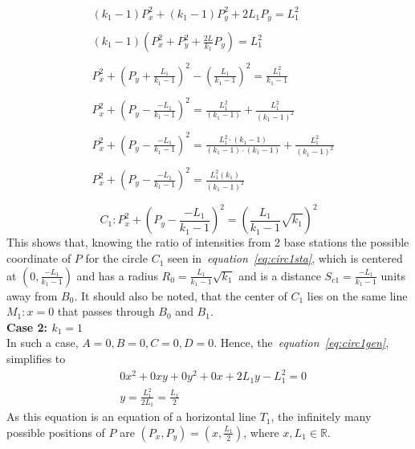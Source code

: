 \documentclass[a4paper,12pt]{article}
\begin{document}
\begin{equation*}
    \begin{split}
        &(k_1-1)P_x^2 + (k_1-1)P_y^2 +2L_1P_y = L_1^2\\\\
        &(k_1-1)\left(P_x^2 + P_y^2 + \frac{2L}{k_1}P_y\right)=L_1^2\\\\
        &P_x^2 + \left(P_y+ \frac{L_1}{k_1-1} \right)^2 - \left(\frac{L_1}{k_1-1}\right)^2 = \frac{L_1^2}{k_1-1}\\\\
        &P_x^2 + \left(P_y - \frac{-L_1}{k_1-1} \right)^2 = \frac{L_1^2}{(k_1-1)} + \frac{L_1^2}{(k_1-1)^2}\\\\
        &P_x^2 + \left(P_y - \frac{-L_1}{k_1-1} \right)^2 = \frac{L_1^2\cdot (k_1-1)}{(k_1-1)\cdot (k_1-1)} + \frac{L_1^2}{(k_1-1)^2}\\\\
        &P_x^2 + \left(P_y - \frac{-L_1}{k_1-1} \right)^2 = \frac{L_1^2(k_1)}{(k_1-1)^2}\\\\
    \end{split}
\end{equation*}
\begin{equation}
    C_1: P_x^2 + \left(P_y - \frac{-L_1}{k_1-1} \right)^2 = \left(\frac{L_1}{k_1-1}\sqrt{k_1}\right)^2
\label{eq:circ1sta}
\end{equation}
This shows that, knowing the ratio of intensities from 2 base stations the possible coordinate of $P$ for the circle $C_1$ seen in~\textit{equation~\ref{eq:circ1sta}}, 
which is centered at $(0,\frac{-L_1}{k_1-1})$ and has a radius $R_0=\frac{L_1}{k_1-1}\sqrt{k_1}$ and is a distance $S_{c1}=\frac{-L_1}{k_1-1}$ units away from $B_0$.
It should also be noted, that the center of $C_1$ lies on the same line $M_1: x=0$ that passes through $B_0$ and $B_1$.
\\
\textbf{Case 2: $k_1=1$}\\
In such a case, $A=0, B=0, C=0, D=0$. Hence, the~\textit{equation~\ref{eq:circ1gen}}, simplifies to 
\begin{equation*}
    \begin{split}
        &0x^2 + 0xy + 0y^2 + 0x + 2L_1y - L_1^2 = 0\\
        &y=\frac{L_1^2}{2L_1}=\frac{L_1}{2}
    \end{split}
\end{equation*}
As this equation is an equation of a horizontal line $T_1$, the infinitely many possible positions of $P$ are $(P_x, P_y)=(x, \frac{L_1}{2})$, where $x,L_1\in \mathbb{R}$. 
\end{document}
